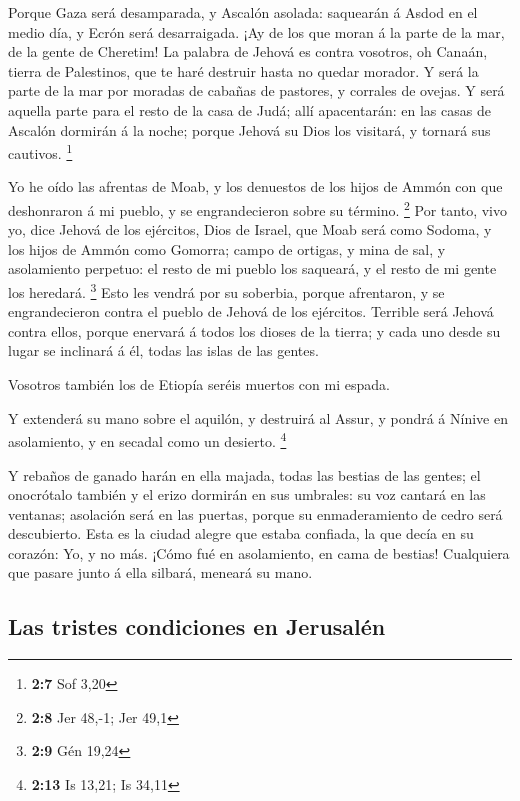  Porque Gaza será desamparada, y Ascalón asolada: saquearán
á Asdod en el medio día, y Ecrón será desarraigada.  ¡Ay de
los que moran á la parte de la mar, de la gente de Cheretim! La palabra
de Jehová es contra vosotros, oh Canaán, tierra de Palestinos, que te
haré destruir hasta no quedar morador.  Y será la parte de
la mar por moradas de cabañas de pastores, y corrales de ovejas.
 Y será aquella parte para el resto de la casa de Judá; allí
apacentarán: en las casas de Ascalón dormirán á la noche; porque Jehová
su Dios los visitará, y tornará sus cautivos. \footnote{\textbf{2:7} Sof
  3,20}

 Yo he oído las afrentas de Moab, y los denuestos de los
hijos de Ammón con que deshonraron á mi pueblo, y se engrandecieron
sobre su término. \footnote{\textbf{2:8} Jer 48,-1; Jer 49,1}
 Por tanto, vivo yo, dice Jehová de los ejércitos, Dios de
Israel, que Moab será como Sodoma, y los hijos de Ammón como Gomorra;
campo de ortigas, y mina de sal, y asolamiento perpetuo: el resto de mi
pueblo los saqueará, y el resto de mi gente los heredará. \footnote{\textbf{2:9}
  Gén 19,24}  Esto les vendrá por su soberbia, porque
afrentaron, y se engrandecieron contra el pueblo de Jehová de los
ejércitos.  Terrible será Jehová contra ellos, porque
enervará á todos los dioses de la tierra; y cada uno desde su lugar se
inclinará á él, todas las islas de las gentes.

 Vosotros también los de Etiopía seréis muertos con mi
espada.

 Y extenderá su mano sobre el aquilón, y destruirá al
Assur, y pondrá á Nínive en asolamiento, y en secadal como un desierto.
\footnote{\textbf{2:13} Is 13,21; Is 34,11}

 Y rebaños de ganado harán en ella majada, todas las
bestias de las gentes; el onocrótalo también y el erizo dormirán en sus
umbrales: su voz cantará en las ventanas; asolación será en las puertas,
porque su enmaderamiento de cedro será descubierto.  Esta
es la ciudad alegre que estaba confiada, la que decía en su corazón: Yo,
y no más. ¡Cómo fué en asolamiento, en cama de bestias! Cualquiera que
pasare junto á ella silbará, meneará su mano.

\hypertarget{las-tristes-condiciones-en-jerusaluxe9n}{%
\subsection{Las tristes condiciones en
Jerusalén}\label{las-tristes-condiciones-en-jerusaluxe9n}}

